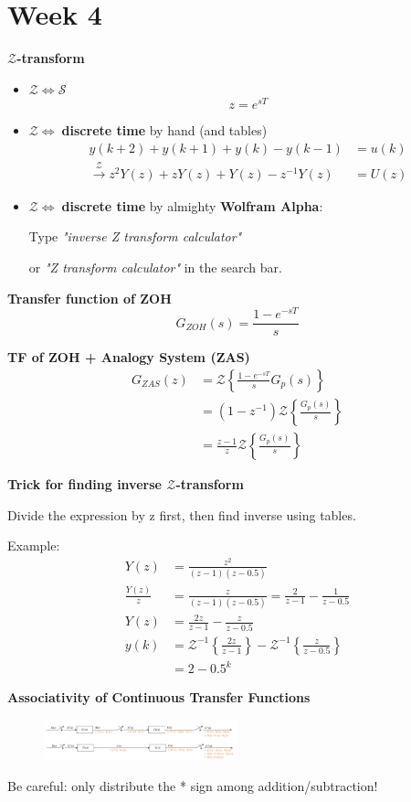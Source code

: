 \section{Week 4}
\textbf{\large $\bm{\mathcal{Z}}$-transform}
\begin{itemize}
    \item $\bm{\mathcal{Z}\Longleftrightarrow\mathcal{S}}$
    \begin{equation*}
        z = e^{sT}
    \end{equation*}
    \item $\bm{\mathcal{Z}\Longleftrightarrow\;}$\textbf{discrete time} by hand (and tables)
    \begin{align*}
        y(k+2) + y(k+1) + y(k) - y(k-1) &= u(k) \\
        \xrightarrow{\mathcal{Z}} z^2 Y(z) + zY(z) + Y(z) - z^{-1} Y(z) &= U(z)
    \end{align*}
    \item $\bm{\mathcal{Z}\Longleftrightarrow\;}$\textbf{discrete time} by almighty \textbf{Wolfram Alpha}: 
    
    Type \textit{"inverse Z transform calculator"} 
    
    or \textit{"Z transform calculator"} in the search bar.
\end{itemize}






\textbf{\large Transfer function of ZOH}
\begin{equation*}
    G_{ZOH}(s) = \frac{1-e^{-sT}}{s} 
\end{equation*}

\textbf{\large TF of ZOH + Analogy System (ZAS)}
\begin{align*}
    G_{ZAS}(z) &= \mathcal{Z}\left\{\frac{1-e^{-sT}}{s}G_{p}(s)\right\} \\
    &=  (1-z^{-1})\mathcal{Z}\left\{\frac{G_p (s)}{s}\right\} \\
    &= \frac{z-1}{z} \mathcal{Z}\left\{\frac{G_p (s)}{s}\right\}
\end{align*}

\textbf{\large Trick for finding inverse $\mathcal{Z}$-transform}

Divide the expression by z first, then find inverse using tables.

Example:
\begin{align*}
    Y(z) &= \frac{z^2}{(z-1)(z-0.5) } \\
    \frac{Y(z)}{z} &= \frac{z}{(z-1)(z-0.5)} = \frac{2}{z-1} - \frac{1}{z-0.5} \\
    Y(z) &= \frac{2z}{z-1} - \frac{z}{z-0.5} \\
    y(k) &= \mathcal{Z}^{-1}\left\{\frac{2z}{z-1}\right\} - \mathcal{Z}^{-1}\left\{ \frac{z}{z-0.5}\right\} \\
    &= 2 - 0.5^{k}
\end{align*}

\textbf{\large Associativity of Continuous Transfer Functions}
\begin{figure}[H]
    \centering
    \includegraphics[width=0.5\textwidth]{images/associativity.png}
\end{figure}
Be careful: only distribute the * sign among addition/subtraction!

